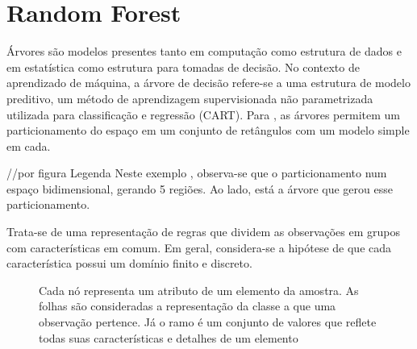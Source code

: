 \section{Random Forest}
Árvores são modelos presentes tanto em computação como estrutura de dados e em estatística como estrutura para tomadas de decisão. No contexto de aprendizado de máquina, a árvore de decisão refere-se a uma estrutura de modelo preditivo, um método de aprendizagem supervisionada não parametrizada utilizada para classificação e regressão (CART). Para , as árvores permitem um particionamento do espaço em um conjunto de retângulos com um modelo simple em cada. 

//por figura
Legenda
Neste exemplo \cite{HASTIE}, observa-se que o particionamento num espaço bidimensional, gerando 5 regiões. Ao lado, está a árvore que gerou esse particionamento.

Trata-se de uma representação de regras que dividem as observações em grupos com características em comum. Em geral, considera-se a hipótese de que cada característica possui um domínio finito e discreto.


\begin{figure}
\centering
{}
\caption{Cada nó representa um atributo de um elemento da amostra. As folhas são consideradas a representação da classe a que uma observação pertence. Já o ramo é um conjunto de valores que reflete todas suas características e detalhes de um elemento}
\end{figure}

